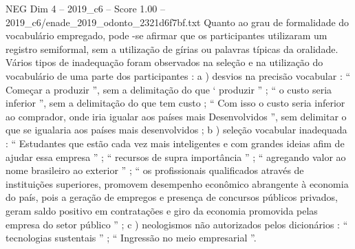 \begin{textsample}{NEG Dim 4 – 2019\_c6 – Score 1.00 – 2019\_c6/enade\_2019\_odonto\_2321d6f7bf.txt}
Quanto ao grau de formalidade do vocabulário empregado, pode -se afirmar que os participantes utilizaram um registro semiformal, sem a utilização de gírias ou palavras típicas da oralidade.
Vários tipos de inadequação foram observados na seleção e na utilização do vocabulário de uma parte dos participantes : a ) desvios na precisão vocabular : “ Começar a produzir ”, sem a delimitação do que ‘ produzir ” ; “ o custo seria inferior ”, sem a delimitação do que tem custo ; “ Com isso o custo seria inferior ao comprador, onde iria igualar aos países mais Desenvolvidos ”, sem delimitar o que se igualaria aos países mais desenvolvidos ; b ) seleção vocabular inadequada : “ Estudantes que estão cada vez mais inteligentes e com grandes ideias afim de ajudar essa empresa ” ; “ recursos de supra importância ” ; “ agregando valor ao nome brasileiro ao exterior ” ; “ os profissionais qualificados através de instituições superiores, promovem desempenho econômico abrangente à economia do país, pois a geração de empregos e presença de concursos públicos privados, geram saldo positivo em contratações e giro da economia promovida pelas empresa do setor público ” ; c ) neologismos não autorizados pelos dicionários : “ tecnologias sustentais ” ; “ Ingressão no meio empresarial ”.

\end{textsample}
